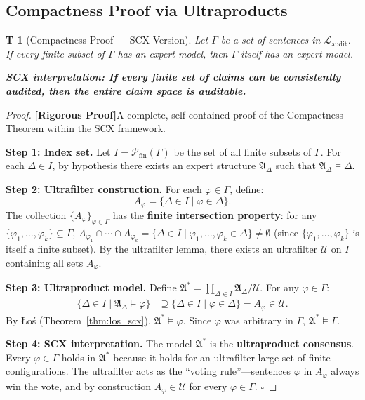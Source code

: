 \documentclass[12pt,a4paper]{article}
\newtheorem{theorem}Theorem[section]
\theoremstyle{remark}
\newcommand{\Lang}{\mathcal{L}}
\newcommand{\Ultrafilter}{\mathcal{U}}
\newcommand{\Struct}{\mathfrak{A}}
\newcommand{\rigorous}{\textnormal{\textbf{[Rigorous Proof]}}}
\begin{document}
\subsection{Compactness Proof via Ultraproducts}
\begin{theorem}[Compactness Proof --- SCX Version]\label{thm:compactness_ultra}
Let \(\Gamma\) be a set of sentences in \(\Lang_{\mathrm{audit}}\). If every finite subset of \(\Gamma\) has an expert model, then \(\Gamma\) itself has an expert model.

\begin{center}
\textbf{SCX interpretation: If every finite set of claims can be consistently audited, then the entire claim space is auditable.}
\end{center}
\end{theorem}
\begin{proof}
\rigorous A complete, self-contained proof of the Compactness Theorem within the SCX framework.

\textbf{Step 1: Index set.} Let \(I = \mathcal{P}_{\mathrm{fin}}(\Gamma)\) be the set of all finite subsets of \(\Gamma\). For each \(\Delta \in I\), by hypothesis there exists an expert structure \(\Struct_\Delta\) such that \(\Struct_\Delta \models \Delta\).

\textbf{Step 2: Ultrafilter construction.} For each \(\varphi \in \Gamma\), define:
\begin{equation}
    A_\varphi = \{\Delta \in I \mid \varphi \in \Delta\}.
\end{equation}
The collection \(\{A_\varphi\}_{\varphi \in \Gamma}\) has the \textbf{finite intersection property}: for any \(\{\varphi_1,\ldots,\varphi_k\} \subseteq \Gamma\), \(A_{\varphi_1} \cap \cdots \cap A_{\varphi_k} = \{\Delta \in I \mid \varphi_1,\ldots,\varphi_k \in \Delta\} \neq \emptyset\) (since \(\{\varphi_1,\ldots,\varphi_k\}\) is itself a finite subset). By the ultrafilter lemma, there exists an ultrafilter \(\Ultrafilter\) on \(I\) containing all sets \(A_\varphi\).

\textbf{Step 3: Ultraproduct model.} Define \(\Struct^* = \prod_{\Delta \in I} \Struct_\Delta / \Ultrafilter\). For any \(\varphi \in \Gamma\):
\begin{align*}
    \{\Delta \in I \mid \Struct_\Delta \models \varphi\}
    &\supseteq \{\Delta \in I \mid \varphi \in \Delta\}
    = A_\varphi \in \Ultrafilter.
\end{align*}
By Łoś (Theorem~\ref{thm:los_scx}), \(\Struct^* \models \varphi\). Since \(\varphi\) was arbitrary in \(\Gamma\), \(\Struct^* \models \Gamma\).

\textbf{Step 4: SCX interpretation.} The model \(\Struct^*\) is the \textbf{ultraproduct consensus}. Every \(\varphi \in \Gamma\) holds in \(\Struct^*\) because it holds for an ultrafilter-large set of finite configurations. The ultrafilter acts as the ``voting rule''---sentences \(\varphi\) in \(A_\varphi\) always win the vote, and by construction \(A_\varphi \in \Ultrafilter\) for every \(\varphi \in \Gamma\). \(\square\)
\end{proof}
\end{document}
